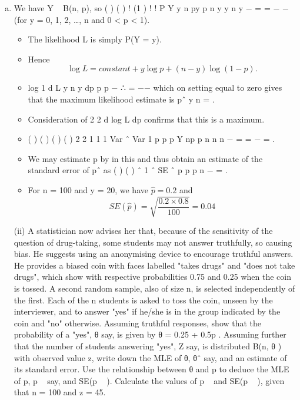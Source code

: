 \documentclass[a4paper,12pt]{article}
\begin{document}
\begin{enumerate}[(a)]
\item We have Y ~ B(n, p), so ( ) ( ) ! (1 )
! !
P Y y n py p n y
y n y
− = = −
−
(for y = 0, 1, 2, …, n
and 0 < p < 1). 
\begin{itemize}
\item
The likelihood L is simply P(Y = y).
\item
Hence \[\log L = constant + y \log p + (n − y)\log(1− p).\]
\item 
log
1
d L y n y
dp p p
− ∴ = −−
which on setting equal to zero gives that the maximum
likelihood estimate is pˆ y
n
= . 

\item Consideration of
2
2
d log L
dp
confirms that this is a
maximum.

\item 
( ) ( ) ( ) ( )
2 2
1 1 1 Var ˆ Var 1
p p
p Y np p
n n n
−
= = − = . 
\item We may estimate p by  in this and
thus obtain an estimate of the standard error of pˆ as ( ) ( ) ˆ 1 ˆ
SE ˆ
p p
p
n
−
= .
\item 
For n = 100 and y = 20, we have $\hat{p} = 0.2$ and 
\[SE( \hat{p} )  =  \sqrt{ \frac{0.2 \times 0.8}{100} } = 0.04\]
\end{itemize}
\begin{framed}
(ii) A statistician now advises her that, because of the sensitivity of the question of
drug-taking, some students may not answer truthfully, so causing bias. He
suggests using an anonymising device to encourage truthful answers. He
provides a biased coin with faces labelled "takes drugs" and "does not take
drugs", which show with respective probabilities 0.75 and 0.25 when the coin
is tossed.
A second random sample, also of size n, is selected independently of the first.
Each of the n students is asked to toss the coin, unseen by the interviewer, and
to answer "yes" if he/she is in the group indicated by the coin and "no"
otherwise.
Assuming truthful responses, show that the probability of a "yes", θ say, is
given by
θ = 0.25 + 0.5p .
Assuming further that the number of students answering "yes", Z say, is
distributed B(n, θ ) with observed value z, write down the MLE of θ, θˆ say,
and an estimate of its standard error. Use the relationship between θ and p to
deduce the MLE of p, p ~ say, and SE(p ~ ). Calculate the values of p ~ and
SE(p ~ ), given that n = 100 and z = 45.
\end{framed}


\end{enumerate}
\end{document}
